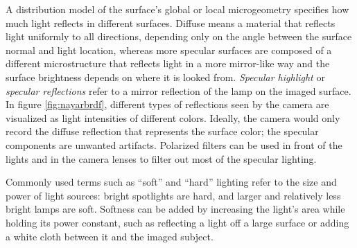 A distribution model of the surface's global or local microgeometry specifies how much light reflects in different surfaces. \cite{nayar1991surface} %
Diffuse means a material that reflects light uniformly to all directions, depending only on the angle between the surface normal and light location, whereas more specular surfaces are composed of a different microstructure that reflects light in a more mirror-like way and the surface brightness depends on where it is looked from.
\emph{Specular highlight} or \emph{specular reflections} refer to a mirror reflection of the lamp on the imaged surface.
In figure \ref{fig:nayarbrdf}, different types of reflections seen by the camera are visualized as light intensities of different colors.
Ideally, the camera would only record the diffuse reflection that represents the surface color;
the specular components are unwanted artifacts.
Polarized filters can be used in front of the lights and in the camera lenses to filter out most of the specular lighting.



Commonly used terms such as ``soft'' and ``hard'' lighting refer to the size and power of light sources: bright spotlights are hard, and larger and relatively less bright lamps are soft.
Softness can be added by increasing the light's area while holding its power constant, such as reflecting a light off a large surface or adding a white cloth between it and the imaged subject.

